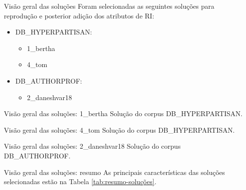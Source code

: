 \documentclass[%
  10pt,%
  aspectratio = 169,%
  compress,%
  t,%
]{beamer}%
\begin{document}
    \begin{frame}{}{Visão geral das soluções}
            Foram selecionadas as seguintes soluções para reprodução e posterior adição dos atributos de RI:
            \begin{itemize}
                \item DB\_HYPERPARTISAN:
                    \begin{itemize}
                        \item 1\_bertha \cite{jiang-etal-2019-team}
                        \item 4\_tom \cite{yeh-etal-2019-tom}
                    \end{itemize}
                \item DB\_AUTHORPROF:
                    \begin{itemize}
                        \item 2\_daneshvar18 \cite{daneshvar:2018}
                    \end{itemize}
            \end{itemize}
    \end{frame}

    \begin{frame}{}{Visão geral das soluções: 1\_bertha}
        Solução do corpus DB\_HYPERPARTISAN.
        
        

    \end{frame}

    \begin{frame}{}{Visão geral das soluções: 4\_tom}
        Solução do corpus DB\_HYPERPARTISAN.
        
        
        
    \end{frame}

    \begin{frame}{}{Visão geral das soluções: 2\_daneshvar18}
        Solução do corpus DB\_AUTHORPROF.
        
        
        
    \end{frame}

    \begin{frame}{}{Visão geral das soluções: resumo}
        As principais características das soluções selecionadas estão na Tabela \ref{tab:resumo-soluções}.
        
        

    \end{frame}
\end{document}
